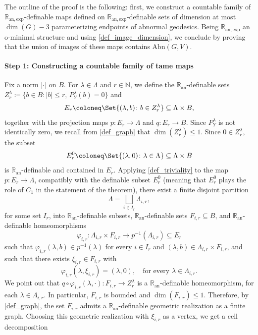 \documentclass[a4paper,11pt,reqno]{amsart}
\theoremstyle{plain}
\theoremstyle{definition}
\newcommand{\Ran}{\mathbb R_{\mathrm{an}}}
\newcommand{\Ranexp}{\mathbb R_{\mathrm{an,exp}}}
\newcommand{\N}{\mathbb N}
\newcommand{\abn}{\mathrm{Abn}}
\begin{document}
    The outline of the proof is the following: first, we construct a countable family of $\Ranexp$-definable maps defined on $\Ranexp$-definable sets of dimension at most $\dim(G)-3$ parameterizing endpoints of abnormal geodesics. Being $\Ranexp$ an o-minimal structure and using \cref{def_image_dimension}, we conclude by proving that the union of images of these maps contains $\abn(G,V)$.

\medskip
    \paragraph{\textbf{Step 1: Constructing a countable family of tame maps}}
Fix a norm $\lvert \cdot \rvert$ on $B$. For $\lambda \in \Lambda$ and $r \in \N$, we define the $\Ran$-definable sets $Z^\lambda_r \coloneq  \{ b \in B \colon \lvert b \rvert \le r, \, P^\lambda_Y(b)=0\}$ and
\begin{equation*}
  E_r \coloneq  \Set{ (\lambda,b) \colon b \in Z^\lambda_r}\subseteq  \Lambda \times B ,
\end{equation*}
together with the projection maps $p \colon E_r \to  \Lambda$ and $q \colon E_r \to B$. Since $P^\lambda_Y$ is not identically zero, we recall from \cref{def_graph} that  $\dim(Z^\lambda_r)\leq 1$. Since $0\in Z_r^\lambda$, the subset
\[
E_r^0 \coloneq \Set{(\lambda,0) \colon \lambda\in \Lambda} \subseteq \Lambda \times B
\]
is $\Ran$-definable and contained in $E_r$. Applying \cref{def_triviality} to the map $p\colon E_r\to  \Lambda$, compatibly with the definable subset $E_r^0$ (meaning that $E_r^0$ plays the role of $C_1$ in the statement of the theorem), there exist a finite disjoint partition
\[
\Lambda=\bigsqcup_{i\in I_r} \Lambda_{i,r},
\]
for some set $I_r$, into $\Ran$-definable subsets, $\Ran$-definable sets $F_{i,r}\subseteq B$, and $\Ran$-definable homeomorphisms
\[
\varphi_{i,r}\colon \Lambda_{i,r}\times F_{i,r}\to p^{-1}(\Lambda_{i,r})\subseteq E_r
\]
such that $\varphi_{i,r}(\lambda,b)\in p^{-1}(\lambda)$ for every $i\in I_r$ and $(\lambda,b)\in \Lambda_{i,r}\times F_{i,r}$, and such that there exists $\xi_{i,r}\in F_{i,r}$ with
\begin{equation} \label{eq:zero_exists} 
\varphi_{i,r}(\lambda,\xi_{i,r})=(\lambda,0),
\quad\text{for every }\lambda\in \Lambda_{i,r}.
\end{equation}
We point out that $q\circ \varphi_{i,r}(\lambda,\cdot): F_{i,r} \to Z^\lambda_r$ is a $\Ran$-definable homeomorphism, %
for each $\lambda \in \Lambda_{i,r}$. In particular, $F_{i,r}$ is bounded and $\dim(F_{i,r})\le 1$. Therefore, by \cref{def_graph}, the set $F_{i,r}$ admits a $\Ran$-definable geometric realization as a finite graph. Choosing this geometric realization with $\xi_{i,r}$ as a vertex, we get a cell decomposition
\end{document}
